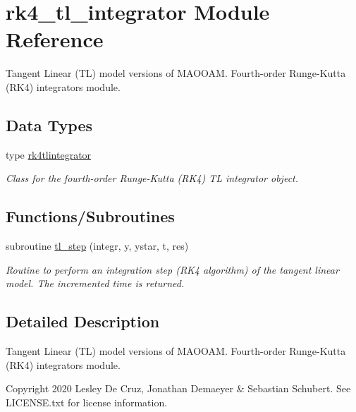 \hypertarget{namespacerk4__tl__integrator}{}\section{rk4\+\_\+tl\+\_\+integrator Module Reference}
\label{namespacerk4__tl__integrator}


Tangent Linear (TL) model versions of M\+A\+O\+O\+AM. Fourth-\/order Runge-\/\+Kutta (R\+K4) integrators module.  


\subsection*{Data Types}
\begin{DoxyCompactItemize}
\item 
type \hyperlink{structrk4__tl__integrator_1_1rk4tlintegrator}{rk4tlintegrator}
\begin{DoxyCompactList}\small\item\em Class for the fourth-\/order Runge-\/\+Kutta (R\+K4) TL integrator object. \end{DoxyCompactList}\end{DoxyCompactItemize}
\subsection*{Functions/\+Subroutines}
\begin{DoxyCompactItemize}
\item 
subroutine \hyperlink{namespacerk4__tl__integrator_a5630423cca1b2495ece95e66814207a1}{tl\+\_\+step} (integr, y, ystar, t, res)
\begin{DoxyCompactList}\small\item\em Routine to perform an integration step (R\+K4 algorithm) of the tangent linear model. The incremented time is returned. \end{DoxyCompactList}\end{DoxyCompactItemize}


\subsection{Detailed Description}
Tangent Linear (TL) model versions of M\+A\+O\+O\+AM. Fourth-\/order Runge-\/\+Kutta (R\+K4) integrators module. 

\begin{DoxyCopyright}{Copyright}
2020 Lesley De Cruz, Jonathan Demaeyer \& Sebastian Schubert. See L\+I\+C\+E\+N\+S\+E.\+txt for license information. 
\end{DoxyCopyright}


